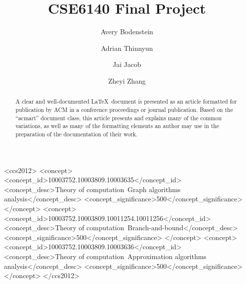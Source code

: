 \documentclass[acmlarge]{acmart}
\begin{document}
\title{CSE6140 Final Project}

\author{Avery Bodenstein}

\author{Adrian Thinnyun}
\authornotemark[1]

\author{Jai Jacob}
\authornotemark[1]

\author{Zheyi Zhang}
\authornotemark[1]


\begin{abstract}
  A clear and well-documented \LaTeX\ document is presented as an
  article formatted for publication by ACM in a conference proceedings
  or journal publication. Based on the ``acmart'' document class, this
  article presents and explains many of the common variations, as well
  as many of the formatting elements an author may use in the
  preparation of the documentation of their work.
\end{abstract}

\begin{CCSXML}
	<ccs2012>
	<concept>
	<concept_id>10003752.10003809.10003635</concept_id>
	<concept_desc>Theory of computation~Graph algorithms analysis</concept_desc>
	<concept_significance>500</concept_significance>
	</concept>
	<concept>
	<concept_id>10003752.10003809.10011254.10011256</concept_id>
	<concept_desc>Theory of computation~Branch-and-bound</concept_desc>
	<concept_significance>500</concept_significance>
	</concept>
	<concept>
	<concept_id>10003752.10003809.10003636</concept_id>
	<concept_desc>Theory of computation~Approximation algorithms analysis</concept_desc>
	<concept_significance>500</concept_significance>
	</concept>
	</ccs2012>
\end{CCSXML}
\end{document}
